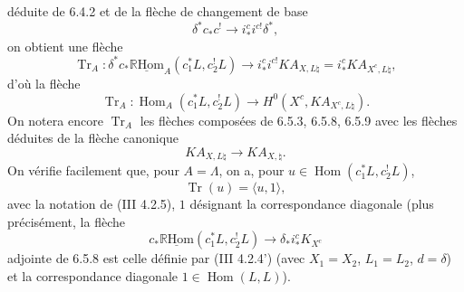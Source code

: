 \documentclass[11pt]{article}
\DeclareMathOperator{\Hom}{Hom}
\newcommand{\R}{\mathbb{R}}\newcommand{\RHomCore}{\mathbb{R}\mathrm{Hom}}
\providecommand{\RHom}{\RHomCore}
\providecommand{\uRHom}{\underline{\RHom}}
\providecommand{\Tr}{\operatorname{Tr}}
\providecommand{\Tr}{\operatorname{Tr}}
\providecommand{\Tr}{\operatorname{Tr}}
\providecommand{\RHom}{\RHomCore}
\providecommand{\Hom}{\operatorname{Hom}}
\providecommand{\RHom}{\R\mathcal{H}om}
\providecommand{\R}{\mathrm R}
\providecommand{\Tr}{\operatorname{Tr}}
\providecommand{\RHom}{\RHomCore}
\providecommand{\Hom}{\operatorname{Hom}}
\providecommand{\Tr}{\operatorname{Tr}}
\begin{document}
déduite de 6.4.2 et de la flèche de changement de base
\[
\delta^*c_*c^!\longrightarrow i_*^ci^{c!}\delta^*,
\]
on obtient une flèche
\begin{equation}
\Tr_A:\delta^*c_*\uRHom_A(c_1^*L,c_2^!L)
\longrightarrow
i_*^ci^{c!}KA_{X,L\natural}
=i_*^cKA_{X^c,L\natural},
\tag{6.5.8}
\end{equation}
d'où la flèche
\begin{equation}
\Tr_A:\Hom_A(c_1^*L,c_2^!L)
\longrightarrow
H^0(X^c,KA_{X^c,L\natural}).
\tag{6.5.9}
\end{equation}
On notera encore $\Tr_A$ les flèches composées de 6.5.3, 6.5.8, 6.5.9 avec les flèches déduites de la flèche canonique
\[
KA_{X,L\natural}\longrightarrow KA_{X,\natural}.
\]
On vérifie facilement que, pour $A=\Lambda$, on a, pour $u\in\Hom(c_1^*L,c_2^!L)$,
\begin{equation}
\Tr(u)=\langle u,1\rangle,
\tag{6.5.10}
\end{equation}
avec la notation de (III 4.2.5), $1$ désignant la correspondance diagonale (plus précisément, la flèche
\[
c_*\uRHom(c_1^*L,c_2^!L)\longrightarrow \delta_*i_*^cK_{X^c}
\]
adjointe de 6.5.8 est celle définie par (III 4.2.4') (avec $X_1=X_2$, $L_1=L_2$, $d=\delta$) et la correspondance diagonale $1\in\Hom(L,L)$).
\end{document}
